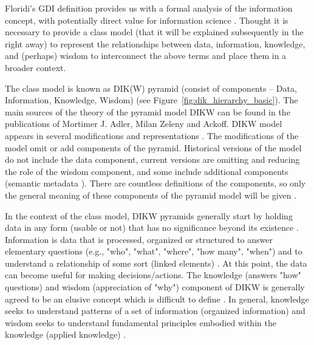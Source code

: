    			Floridi’s GDI definition provides us with a formal analysis of the information concept, with potentially direct value for information science \cite{Bawden2012}. Thought it is necessary to provide a class model (that it will be explained subsequently in the right away) to represent the relationships between data, information, knowledge, and (perhaps) wisdom to interconnect the above terms and place them in a broader context.
					
			The class model is known as DIK(W) pyramid (consist of components -- Data, Information, Knowledge, Wisdom) (see Figure~\ref{fig:dik_hierarchy_basic}). The main sources of the theory of the pyramid model DIKW can be found in the publications of Mortimer J. Adler\cite{Adler1986}, Milan Zeleny\cite{Zeleny1987} and Ackoff\cite{Ackoff1989}. DIKW model appears in several modifications \cite{Severini2016} \cite{Bawden2012} and representations \cite{Rowley2007}. The modifications of the model omit or add components of the pyramid. Historical versions of the model do not include the data component, current versions are omitting and reducing the role of the wisdom component, and some include additional components (semantic metadata \cite{Severini2016}). There are countless definitions of the components, so only the general meaning of these components of the pyramid model will be given \cite{Zins2007}.
			
		
			In the context of the class model, DIKW pyramids generally start by holding data in any form (usable or not) that has no significance beyond its existence \cite{Bellinger2007}. Information is data that is processed, organized or structured to answer elementary questions (e.g., "who", "what", "where", "how many", "when") and to understand a relationship of some sort (linked elements) \cite{Bellinger2007}. At this point, the data can become useful for making decisions/actions. The knowledge (answers "how" questions) and wisdom (appreciation of "why") component of DIKW is generally agreed to be an elusive concept which is difficult to define \cite{Rowley2007}. In general, knowledge seeks to understand patterns of a set of information (organized information) and wisdom seeks to understand fundamental principles embodied within the knowledge (applied knowledge) \cite{Bellinger2007}.
					
			

